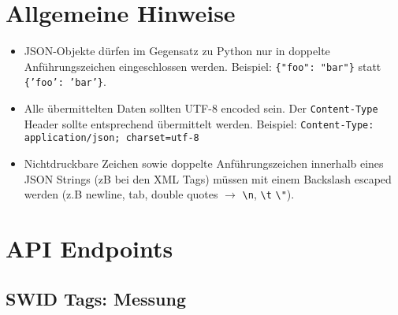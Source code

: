 \documentclass[10pt,a4paper]{scrartcl}
\newcommand*{\escape}[1]{\texttt{\textbackslash#1}}
\begin{document}
\section{Allgemeine Hinweise}

\begin{itemize}
	\item JSON-Objekte dürfen im Gegensatz zu Python nur in doppelte
		Anführungszeichen eingeschlossen werden. Beispiel: \texttt{\{"foo": "bar"\}}
		statt \texttt{\{'foo': 'bar'\}}.
	\item Alle übermittelten Daten sollten UTF-8 encoded sein. Der
		\texttt{Content-Type} Header sollte entsprechend übermittelt werden.
		Beispiel: \texttt{Content-Type: application/json; charset=utf-8}
	\item Nichtdruckbare Zeichen sowie doppelte Anführungszeichen innerhalb eines
		JSON Strings (zB bei den XML Tags) müssen mit einem Backslash escaped werden
		(z.B newline, tab, double quotes $\rightarrow$ \escape{n}, \escape{t}
		\escape{"}).
\end{itemize}


\pagebreak
\section{API Endpoints}

\subsection{SWID Tags: Messung}
\label{api:measurement}
\end{document}
